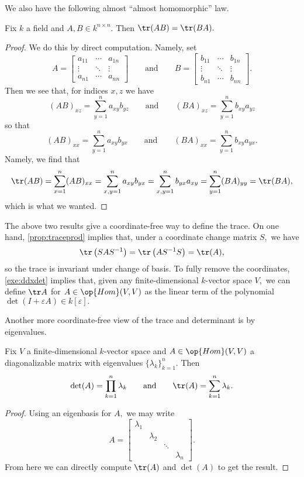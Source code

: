 We also have the following almost ``almost homomorphic'' law.
\begin{prop} \label{prop:traceprod}
	Fix $k$ a field and $A,B\in k^{n\times n}.$ Then $\tr (AB)=\tr (BA).$
\end{prop}
\begin{proof}
	We do this by direct computation. Namely, set
	\[A=\begin{bmatrix}
		a_{11} & \cdots & a_{1n} \\
		\vdots & \ddots & \vdots \\
		a_{n1} & \cdots & a_{nn}
	\end{bmatrix}\qquad\text{and}\qquad B=\begin{bmatrix}
		b_{11} & \cdots & b_{1n} \\
		\vdots & \ddots & \vdots \\
		b_{n1} & \cdots & b_{nn}
	\end{bmatrix}.\]
	Then we see that, for indices $x,z$ we have
	\[(AB)_{xz}=\sum_{y=1}^na_{xy}b_{yz}\qquad\text{and}\qquad(BA)_{xz}=\sum_{y=1}^nb_{xy}a_{yz}\]
	so that
	\[(AB)_{xx}=\sum_{y=1}^na_{xy}b_{yx}\qquad\text{and}\qquad(BA)_{xx}=\sum_{y=1}^nb_{xy}a_{yx}.\]
	Namely, we find that
	\[\tr (AB)=\sum_{x=1}^n(AB)_{xx}=\sum_{x,y=1}^na_{xy}b_{yx}=\sum_{x,y=1}^nb_{yx}a_{xy}=\sum_{y=1}^n(BA)_{yy}=\tr (BA),\]
	which is what we wanted.
\end{proof}
\begin{remark}[Nir]
	The above two results give a coordinate-free way to define the trace. On one hand, \autoref{prop:traceprod} implies that, under a coordinate change matrix $S,$ we have
	\[\tr \left(SAS^{-1}\right)=\tr \left(AS^{-1}S\right)=\tr (A),\]
	so the trace is invariant under change of basis. To fully remove the coordinates, \autoref{exe:ddxdet} implies that, given any finite-dimensional $k$-vector space $V,$ we can define $\tr A$ for $A\in\op{Hom}(V,V)$ as the linear term of the polynomial $\det(I+\varepsilon A)\in k[\varepsilon].$
\end{remark}
Another more coordinate-free view of the trace and determinant is by eigenvalues.
\begin{prop}
	Fix $V$ a finite-dimensional $k$-vector space and $A\in\op{Hom}(V,V)$ a diagonalizable matrix with eigenvalues $\{\lambda_k\}_{k=1}^n.$ Then
	\[\det (A)=\prod_{k=1}^n\lambda_k\qquad\text{and}\qquad\tr (A)=\sum_{k=1}^n\lambda_k.\]
\end{prop}
\begin{proof}
	Using an eigenbasis for $A,$ we may write
	\[A=\begin{bmatrix}
		\lambda_1 \\
		& \lambda_2 \\
		& & \ddots \\
		& & & \lambda_n
	\end{bmatrix}.\]
	From here we can directly compute $\tr (A)$ and $\det (A)$ to get the result.
\end{proof}

